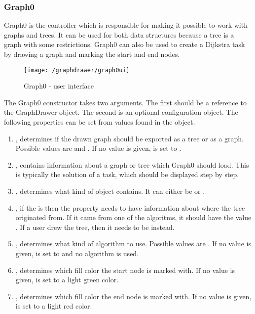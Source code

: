 \subsubsection{Graph0}
Graph0 is the controller which is responsible for making it possible to work with graphs and trees. It can be used for both data structures because a tree is a graph with some restrictions. Graph0 can also be used to create a Dijkstra task by drawing a graph and marking the start and end nodes. 
\begin{figure}[H]
    \centering
    \texttt{[image: /graphdrawer/graph0ui]}
    \caption{Graph0 - user interface}
    \label{fig:graphdrawerGraph0UserInterface}
\end{figure}
\noindent
The Graph0 constructor takes two arguments. The first should be a reference to the GraphDrawer object. The second is an optional configuration object. The following properties can be set from values found in the object.
\begin{enumerate}
    \item {}, determines if the drawn graph should be exported as a tree or as a graph. Possible values are  and . If no value is given,  is set to .
    \item {}, contains information about a graph or tree which Graph0 should load. This is typically the solution of a task, which should be displayed step by step.
    \item {}, determines what kind of object  contains. It can either be  or .
    \item {}, if the  is  then the  property needs to have information about where the tree originated from. If it came from one of the algoritms, it should have the value . If a user drew the tree, then it needs to be  instead.
    \item {}, determines what kind of algorithm to use. Possible values are . If no value is given,  is set to  and no algorithm is used.
    \item {}, determines which fill color the start node is marked with. If no value is given,  is set to a light green color.
    \item {}, determines which fill color the end node is marked with. If no value is given,  is set to a light red color.
\end{enumerate}
